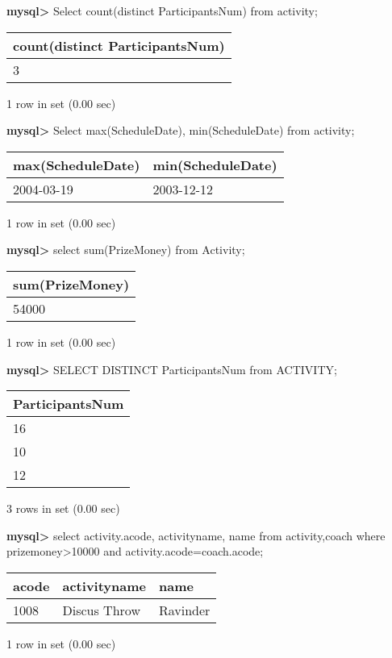 \documentclass[11pt]{article}
\begin{document}
\textbf{mysql>} Select count(distinct ParticipantsNum) from activity;
\begin{center}
\begin{tabular}{|l|}
\hline
count(distinct ParticipantsNum) \\
\hline
3 \\
\hline
\end{tabular}
\end{center}
1 row in set (0.00 sec)

\textbf{mysql>} Select max(ScheduleDate), min(ScheduleDate) from activity;
\begin{center}
\begin{tabular}{|l|l|}
\hline
max(ScheduleDate) & min(ScheduleDate) \\
\hline
2004-03-19 & 2003-12-12 \\
\hline
\end{tabular}
\end{center}
1 row in set (0.00 sec)

\textbf{mysql>} select sum(PrizeMoney) from Activity;
\begin{center}
\begin{tabular}{|l|}
\hline
sum(PrizeMoney) \\
\hline
54000 \\
\hline
\end{tabular}
\end{center}
1 row in set (0.00 sec)

\textbf{mysql>} SELECT DISTINCT ParticipantsNum  from ACTIVITY;
\begin{center}
\begin{tabular}{|l|}
\hline
ParticipantsNum \\
\hline
16 \\
10 \\
12 \\
\hline
\end{tabular}
\end{center}
3 rows in set (0.00 sec)

\textbf{mysql>} select activity.acode, activityname, name from activity,coach where prizemoney>10000 and activity.acode=coach.acode;
\begin{center}
\begin{tabular}{|l|l|l|}
\hline
acode & activityname & name \\
\hline
1008 & Discus Throw & Ravinder \\
\hline
\end{tabular}
\end{center}
1 row in set (0.00 sec)
\end{document}
